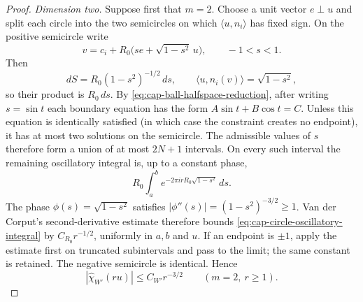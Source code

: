\documentclass[11pt,reqno,a4paper]{amsart}
\numberwithin{equation}{section}
\theoremstyle{compact}
\theoremstyle{definition}
\theoremstyle{definition}
\begin{document}
\begin{proof}
\smallskip\noindent\emph{Dimension two.}
Suppose first that $m=2$.  Choose a unit vector $e\perp u$ and split each
circle into the two semicircles on which
$\langle u,n_i\rangle$ has fixed sign.  On the positive semicircle write
\begin{equation}\label{eq:cap-circle-direction-coordinates}
  v=c_i+R_0\bigl(se+\sqrt{1-s^2}\,u\bigr),
  \qquad -1<s<1.
\end{equation}
Then
\begin{equation}\label{eq:cap-circle-amplitude-cancellation}
  dS=R_0(1-s^2)^{-1/2}\,ds,
  \qquad
  \langle u,n_i(v)\rangle=\sqrt{1-s^2},
\end{equation}
so their product is $R_0\,ds$.  By
\eqref{eq:cap-ball-halfspace-reduction}, after writing $s=\sin t$ each
boundary equation has the form $A\sin t+B\cos t=C$.  Unless this
equation is identically satisfied (in which case the constraint creates no
endpoint), it has at most two solutions on the semicircle.  The admissible
values of $s$ therefore form a union of at most $2N+1$ intervals.  On every such interval the remaining
oscillatory integral is, up to a constant phase,
\begin{equation}\label{eq:cap-circle-oscillatory-integral}
  R_0\int_a^b e^{-2\pi i rR_0\sqrt{1-s^2}}\,ds.
\end{equation}
The phase $\phi(s)=\sqrt{1-s^2}$ satisfies
$|\phi''(s)|=(1-s^2)^{-3/2}\geq1$.  Van der Corput's second-derivative
estimate therefore bounds \eqref{eq:cap-circle-oscillatory-integral} by
$C_{R_0}r^{-1/2}$, uniformly in $a,b$ and $u$.  If an endpoint is
$\pm1$, apply the estimate first on truncated subintervals and pass to the
limit; the same constant is retained.  The negative semicircle is
identical.  Hence
\begin{equation}\label{eq:cap-two-dimensional-face-bound}
  |\widehat\chi_{W'}(ru)|\leq C_{W'}r^{-3/2}
  \qquad(m=2,\ r\geq1).
\end{equation}


\end{proof}
\end{document}
